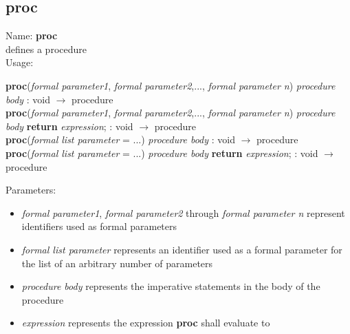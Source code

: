 \subsection{proc}
\label{labproc}
\noindent Name: \textbf{proc}\\
\phantom{aaa}defines a \sollya procedure\\[0.2cm]
\noindent Usage: 
\begin{center}
\textbf{proc}(\emph{formal parameter1}, \emph{formal parameter2},..., \emph{formal parameter n}) \key{$\lbrace$} \emph{procedure body} \key{$\rbrace$} : \textsf{void} $\rightarrow$ \textsf{procedure}\\
\textbf{proc}(\emph{formal parameter1}, \emph{formal parameter2},..., \emph{formal parameter n}) \key{$\lbrace$} \emph{procedure body} \textbf{return} \emph{expression}; \key{$\rbrace$} : \textsf{void} $\rightarrow$ \textsf{procedure}\\
\textbf{proc}(\emph{formal list parameter} = ...) \key{$\lbrace$} \emph{procedure body} \key{$\rbrace$} : \textsf{void} $\rightarrow$ \textsf{procedure}\\
\textbf{proc}(\emph{formal list parameter} = ...) \key{$\lbrace$} \emph{procedure body} \textbf{return} \emph{expression}; \key{$\rbrace$} : \textsf{void} $\rightarrow$ \textsf{procedure}\\
\end{center}
Parameters: 
\begin{itemize}
\item \emph{formal parameter1}, \emph{formal parameter2} through \emph{formal parameter n} represent identifiers used as formal parameters
\item \emph{formal list parameter} represents an identifier used as a formal parameter for the list of an arbitrary number of parameters
\item \emph{procedure body} represents the imperative statements in the body of the procedure
\item \emph{expression} represents the expression \textbf{proc} shall evaluate to
\end{itemize}
